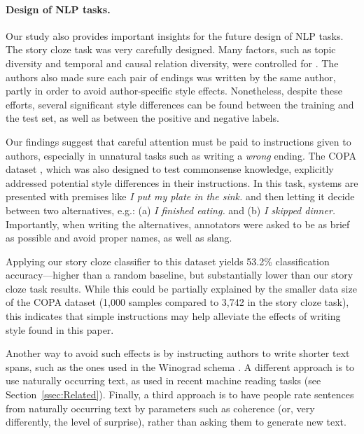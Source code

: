 \documentclass[11pt,a4paper]{article}
\newcommand{\secref}[1]{Section~\ref{ssec:#1}}
\newcommand{\roy}[1]{{\color{orange}\textsc{[#1 --rs]}}}
\renewcommand{\roy}[1]{{\color{orange}[#1 --rs]}}
\renewcommand{\roy}[1]{#1}
\begin{document}
\paragraph{Design of NLP tasks.}
Our study also provides important insights for the future design of NLP tasks. 
The story cloze task was very carefully designed. Many factors, such
as topic diversity and temporal and causal relation diversity,  were controlled for \cite{Mostafazadeh:2016}. 
The authors also made sure each pair of endings was written by the
same author, partly in order to avoid author-specific style effects.
 Nonetheless, despite these efforts, several significant style
 differences can be found between the training and the test set, as well as between the positive and negative labels. 
 
Our findings suggest that careful attention must be paid to instructions given to authors, especially in unnatural tasks such as writing a {\it wrong} ending. 
\roy{The COPA dataset \cite{Roemmele:2011}, which was also designed to test commonsense knowledge, explicitly addressed potential style differences in their instructions. In this task,  systems are presented with premises like {\it I put my plate in the sink.} and then letting it decide between two alternatives, e.g.: (a) {\it I finished eating.} and (b) {\it I skipped dinner.}}
Importantly, when writing the alternatives,  annotators were asked to be as brief as possible and avoid proper names, as well as  slang. 

Applying our story cloze classifier to this dataset yields 53.2\% classification accuracy---higher than a random baseline, but substantially lower than our story cloze task results. 
While this could be partially explained by the smaller data size of the COPA dataset (1,000 samples compared to 3,742 in the story cloze task), this indicates that simple instructions may help alleviate the effects of writing style found in this paper.

Another way to avoid such effects is by instructing authors to write shorter text spans, such as the ones used in the Winograd schema \cite{Levesque:2011}.
A different approach is to use naturally occurring text, as used in recent machine reading tasks (see \secref{Related}). 
Finally, a third approach is to have people rate sentences from naturally occurring text by parameters
such as coherence (or, very differently, the level of surprise),
rather than asking them to generate new text.
\end{document}
